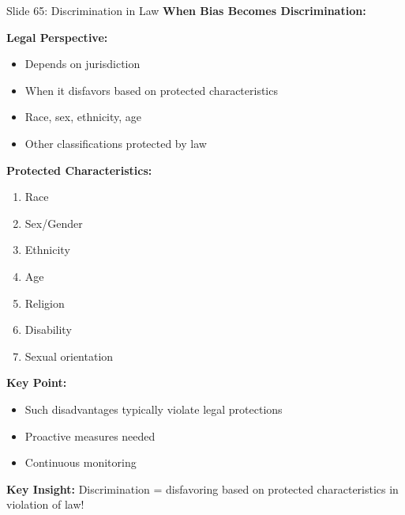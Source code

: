 \documentclass[8pt]{beamer}
\begin{document}
	\begin{frame}{Slide 65: Discrimination in Law}
		\fontsize{6.5}{7.5}\selectfont
		\textbf{When Bias Becomes Discrimination:}
		
		\vspace{0.1cm}
		\textbf{Legal Perspective:}
		\begin{itemize}
			\item Depends on jurisdiction
			\item When it disfavors based on protected characteristics
			\item Race, sex, ethnicity, age
			\item Other classifications protected by law
		\end{itemize}
		
		\vspace{0.1cm}
		\textbf{Protected Characteristics:}
		\begin{enumerate}
			\item Race
			\item Sex/Gender
			\item Ethnicity
			\item Age
			\item Religion
			\item Disability
			\item Sexual orientation
		\end{enumerate}
		
		\vspace{0.1cm}
		\textbf{Key Point:}
		\begin{itemize}
			\item Such disadvantages typically violate legal protections
			\item Proactive measures needed
			\item Continuous monitoring
		\end{itemize}
		
		\textcolor{myblue}{\textbf{Key Insight:}} Discrimination = \textcolor{myblue}{disfavoring based on protected characteristics} in violation of law!
	\end{frame}
	
\end{document}
